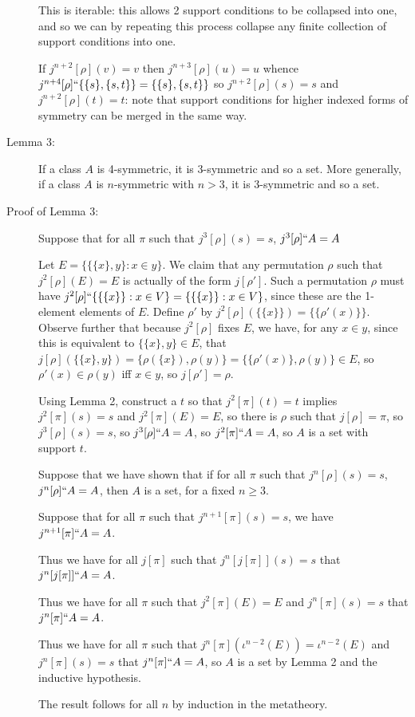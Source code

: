 \documentclass[12pt]{article}
\begin{document}
\begin{description}
This is iterable:  this allows 2 support conditions to be collapsed into one, and so we can by repeating this process collapse any finite collection of support conditions into one.

If $j^{n+2}[\rho](v)=v$ then $j^{n+3}[\rho](u) = u$ whence $j^{n+4}[\rho]``\{\{s\},\{s,t\}\}= \{\{s\},\{s,t\}\}$ so $j^{n+2}[\rho](s)=s$ and $j^{n+2}[\rho](t)=t$:  note that support conditions for higher indexed forms of symmetry can be merged in the same way.

\item[Lemma 3:]  If a class $A$ is 4-symmetric, it is 3-symmetric and so a set.  More generally, if a class $A$ is $n$-symmetric with $n>3$, it is 3-symmetric and so a set.

\item[Proof of Lemma 3:]  Suppose that for all $\pi$ such that $j^3[\rho](s)=s$, $j^3[\rho]``A =A$

Let $E = \{\{\{x\},y\}:x \in y\}$.  We claim that any permutation $\rho$ such that $j^2[\rho](E)=E$ is actually of the form $j[\rho']$.
Such a permutation $\rho$ must have $j^2[\rho]``\{\{\{x\}\}:x \in V\}= \{\{\{x\}\}:x \in V\}$, since these are the 1-element elements of $E$.
Define $\rho'$ by $j^2[\rho](\{\{x\}\}) = \{\{\rho'(x)\}\}$.  Observe further that because $j^2[\rho]$ fixes $E$, we have, for any $x \in y$, since this is equivalent to $\{\{x\},y\} \in E$,
that $j[\rho](\{\{x\},y\}) = \{\rho(\{x\}),\rho(y)\} = \{\{\rho'(x)\},\rho(y)\} \in E$, so $\rho'(x) \in \rho(y)$ iff $x \in y$, so $j[\rho']=\rho$.

Using Lemma 2, construct a $t$ so that $j^2[\pi](t)=t$ implies $j^2[\pi](s)=s$ and $j^2[\pi](E)=E$, so there is $\rho$ such
that $j[\rho]=\pi$, so  $j^3[\rho](s)=s$, so $j^3[\rho]``A =A$, so $j^2[\pi]``A=A$, so $A$ is a set with support $t$.

Suppose that we have shown that if for all $\pi$ such that $j^n[\rho](s)=s$, $j^n[\rho]``A =A$, then $A$ is a set, for a fixed $n \geq 3$.

Suppose that for all $\pi$ such that $j^{n+1}[\pi](s)=s$, we have $j^{n+1}[\pi]``A =A$.

Thus we have for all $j[\pi]$ such that $j^n[j[\pi]](s) = s$ that $j^n[j[\pi]]``A = A$.

Thus we have for all $\pi$ such that $j^2[\pi](E) = E$ and $j^n[\pi](s)=s$ that $ j^n[\pi]``A = A$.

Thus we have for all $\pi$ such that $j^n[\pi](\iota^{n-2}(E)) = \iota^{n-2}(E)$ and $j^n[\pi](s)=s$ that  $ j^n[\pi]``A = A$, so $A$ is a set by Lemma 2 and the inductive hypothesis.

The result follows for all $n$ by induction in the metatheory.



\end{description}
\end{document}
